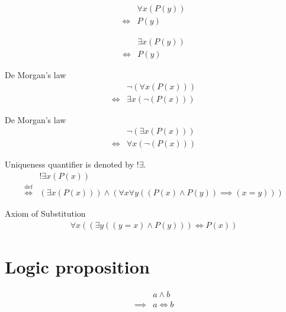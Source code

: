 \begin{axm}
\label{Axiom:forall_independent_variable}
\begin{align*}
& \forall x (P(y)) \\
\iff & P(y)
\end{align*}
\end{axm}

\begin{axm}
\label{Axiom:exists_independent_variable}
\begin{align*}
& \exists x (P(y)) \\
\iff & P(y)
\end{align*}
\end{axm}

\begin{axm}
\label{Axiom:De_Morgan_1}
De Morgan's law
\begin{align*}
& \lnot (\forall x (P(x))) \\
\iff & \exists x (\lnot (P(x)))
\end{align*}
\end{axm}

\begin{axm}
\label{Axiom:De_Morgan_2}
De Morgan's law
\begin{align*}
& \lnot (\exists x (P(x))) \\
\iff & \forall x (\lnot (P(x)))
\end{align*}
\end{axm}

\begin{defn}
\label{Definition:uniqueness_quantifier}
Uniqueness quantifier is denoted by $!\exists$.
\begin{align*}
& !\exists x (P(x)) \\
\overset{\operatorname{def}}{\iff} & (\exists x (P(x))) \land (\forall x \forall y ((P(x) \land P(y)) \implies (x = y)))
\end{align*}
\end{defn}

\begin{axm}
\label{Axiom:axiom_of_substitution}
Axiom of Substitution
\begin{align*}
\forall x ((\exists y ((y = x) \land P(y))) \iff P(x))
\end{align*}
\end{axm}

\section{Logic proposition}
\begin{prop}
\label{Proposition:land_implies_iff}
\begin{align*}
& a \land b \\
\implies & a \iff b
\end{align*}
\end{prop}

